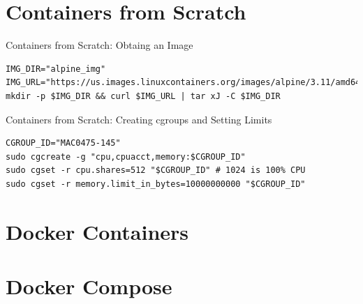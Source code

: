 \documentclass[10pt, compress, aspectratio=169, xcolor={table,usenames,dvipsnames}]{beamer}
\begin{document}
\section{Containers from Scratch}
\label{sec:org7c5b834}
\begin{frame}[label={sec:orgec764f8},fragile]{Containers from Scratch: Obtaing an Image}
 \lstset{language=bash,label= ,caption= ,captionpos=b,numbers=none}
\begin{lstlisting}
IMG_DIR="alpine_img"
IMG_URL="https://us.images.linuxcontainers.org/images/alpine/3.11/amd64/default/20200521_13:00/rootfs.tar.xz"
mkdir -p $IMG_DIR && curl $IMG_URL | tar xJ -C $IMG_DIR
\end{lstlisting}
\end{frame}
\begin{frame}[label={sec:org76a9658},fragile]{Containers from Scratch: Creating cgroups and Setting Limits}
 \lstset{language=bash,label= ,caption= ,captionpos=b,numbers=none}
\begin{lstlisting}
CGROUP_ID="MAC0475-145"
sudo cgcreate -g "cpu,cpuacct,memory:$CGROUP_ID"
sudo cgset -r cpu.shares=512 "$CGROUP_ID" # 1024 is 100% CPU
sudo cgset -r memory.limit_in_bytes=10000000000 "$CGROUP_ID"
\end{lstlisting}
\end{frame}

\section{Docker Containers}
\label{sec:orgca365b8}
\section{Docker Compose}
\label{sec:orgf4bae41}
\end{document}

